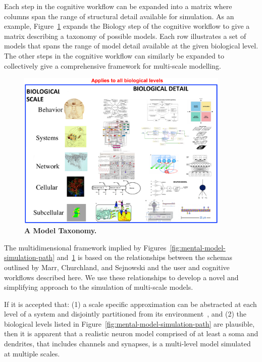 \documentclass{article}
\begin{document}
Each step in the cognitive workflow can be expanded into a matrix where columns span the range of structural detail available for simulation.  As an example, Figure~\ref{fig:multi-scale-taxonomy} expands the Biology step of the cognitive workflow to give a matrix describing a taxonomy of possible models.  Each row illustrates a set of models that spans the range of model detail available at the given biological level.  The other steps in the cognitive workflow can similarly be expanded to collectively give a comprehensive framework for multi-scale modelling. 

\begin{figure}[h!t]
  \begin{center}
    \includegraphics[width=4in]{figures/multi-scale-taxonomy-no-arrows.eps}
  \end{center}
  \caption{ {\bf A Model Taxonomy.} }
  \label{fig:multi-scale-taxonomy}
\end{figure}

The multidimensional framework implied by Figures~\ref{fig:mental-model-simulation-path} and~\ref{fig:multi-scale-taxonomy} is based on the relationships between the schemas outlined by Marr, Churchland, and Sejnowski and the user and cognitive workflows described here.  We use these relationships to develop a novel and simplifying approach to the simulation of multi-scale models.

If it is accepted that: (1) a scale specific approximation can be abstracted at each level of a system and disjointly partitioned from its environment~\cite{Bertalanffy:1973zr, Heylighen:2006vn}, and (2) the biological levels listed in Figure~\ref{fig:mental-model-simulation-path} are plausible, then it is apparent that a realistic neuron model comprised of at least a soma and dendrites, that includes channels and synapses, is a multi-level model simulated at multiple scales.
\end{document}
